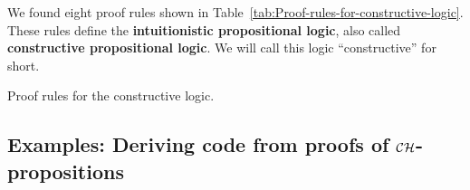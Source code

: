 We found eight proof rules shown in Table~\ref{tab:Proof-rules-for-constructive-logic}.
These rules define the \textbf{intuitionistic
propositional logic}, also called \textbf{constructive
propositional logic}. We will call this logic \textsf{``}constructive\textsf{''} for
short.

\begin{table}
\begin{centering}
{\small{}}%
\par\end{centering}
\caption{Proof rules for the constructive logic.\label{tab:Proof-rules-for-constructive-logic}}
\end{table}


\subsection{Examples: Deriving code from proofs of ${\cal CH}$-propositions\label{subsec:Example:-Proving-a-ch-proposition}}

